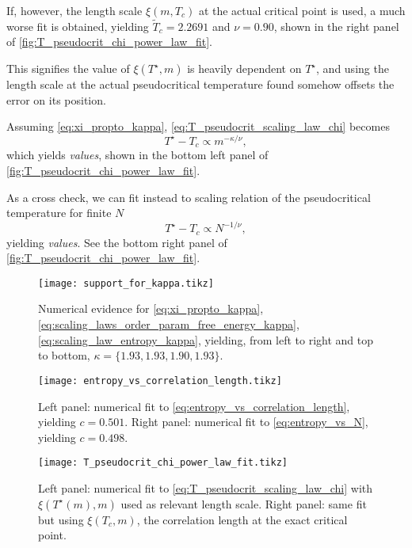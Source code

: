 If, however, the length scale $\xi(m, T_c)$ at the actual critical point is used, a much worse fit is obtained, yielding
$\widetilde{T}_c = 2.2691$ and $\nu = 0.90$, shown in the right panel of
\autoref{fig:T_pseudocrit_chi_power_law_fit}.

This signifies the value of $\xi(T^{\star}, m)$ is heavily dependent on
$T^{\star}$, and using the length scale at the actual pseudocritical temperature found somehow offsets the error on its
position.

Assuming \autoref{eq:xi_propto_kappa}, \autoref{eq:T_pseudocrit_scaling_law_chi} becomes
\begin{equation}
  T^{\star} - T_c \propto m^{-\kappa / \nu},
\end{equation}
which yields \emph{values}, shown in the bottom left panel of \autoref{fig:T_pseudocrit_chi_power_law_fit}.

As a cross check, we can fit instead to scaling relation of the pseudocritical temperature for finite $N$
\begin{equation}
  T^{\star} - T_c \propto N^{-1/\nu},
\end{equation}
yielding \emph{values}. See the bottom right panel of \autoref{fig:T_pseudocrit_chi_power_law_fit}.




\begin{figure}
  \texttt{[image: support\_for\_kappa.tikz]}
  \caption{Numerical evidence for \autoref{eq:xi_propto_kappa}, \autoref{eq:scaling_laws_order_param_free_energy_kappa},
  \autoref{eq:scaling_law_entropy_kappa}, yielding, from left to right and top to bottom, $\kappa = \{ 1.93, 1.93, 1.90,
  1.93 \}$.}\label{fig:support_for_kappa}
\end{figure}

\begin{figure}
  \texttt{[image: entropy\_vs\_correlation\_length.tikz]}
  \caption{Left panel: numerical fit to \autoref{eq:entropy_vs_correlation_length}, yielding $c = 0.501$. Right panel:
  numerical fit to \autoref{eq:entropy_vs_N}, yielding $c = 0.498$. }\label{fig:entropy_vs_correlation_length}
\end{figure}

\begin{figure}
  \texttt{[image: T\_pseudocrit\_chi\_power\_law\_fit.tikz]}
  \caption{Left panel: numerical fit to \autoref{eq:T_pseudocrit_scaling_law_chi} with $\xi(T^{\star}(m), m)$ used as
  relevant length scale. Right panel: same fit but using $\xi(T_c, m)$, the correlation length at the exact critical
  point.}\label{fig:T_pseudocrit_chi_power_law_fit}
\end{figure}

